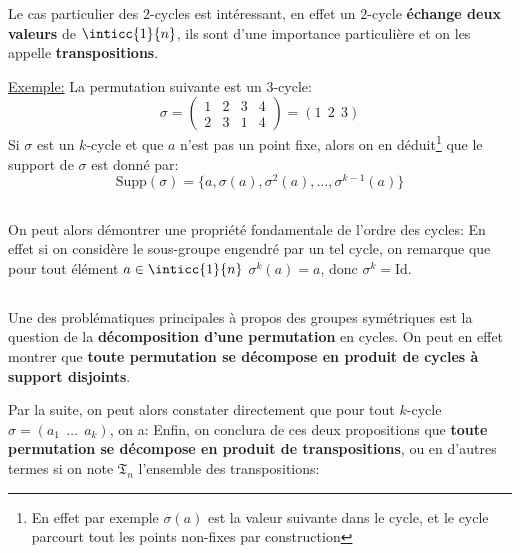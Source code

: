 Le cas particulier des \(2\)-cycles est intéressant, en effet un \(2\)-cycle \textbf{échange deux valeurs} de \(\inticc{1}{n}\), ils sont d'une importance particulière et on les appelle \textbf{transpositions}.\<

\underline{Exemple:} La permutation suivante est un 3-cycle:
\[
   \sigma =  \begin{pmatrix}
      1 & 2 & 3 & 4\\
      2 & 3 & 1 & 4
   \end{pmatrix} = (1 \;\, 2 \;\, 3)
\]
Si \(\sigma\) est un \(k\)-cycle et que \(a\) n'est pas un point fixe, alors on en déduit\footnote[1]{En effet par exemple \(\sigma(a)\) est la valeur suivante dans le cycle, et le cycle parcourt tout les points non-fixes par construction} que le support de \(\sigma\) est donné par:
\[
   \text{Supp}(\sigma) = \bigl\{a, \sigma(a), \sigma^2(a), \ldots, \sigma^{k-1}(a) \bigl\}
\]

\subsection*{}
On peut alors démontrer une propriété fondamentale de l'ordre des cycles:
En effet si on considère le sous-groupe engendré par un tel cycle, on remarque que pour tout élément \(a \in \inticc{1}{n}\) \(\sigma^{k}(a) = a\), donc \(\sigma^{k} = \text{Id}\).
\subsection*{}
Une des problématiques principales à propos des groupes symétriques est la question de la \textbf{décomposition d'une permutation} en cycles. On peut en effet montrer que \textbf{toute permutation se décompose en produit de cycles à support disjoints}.\<

Par la suite, on peut alors constater directement que pour tout \(k\)-cycle \(\sigma = (a_1 \;\, \ldots \;\, a_k)\), on a:
Enfin, on conclura de ces deux propositions que \textbf{toute permutation se décompose en produit de transpositions}, ou en d'autres termes si on note \(\mathfrak{T}_n\) l'ensemble des transpositions:

